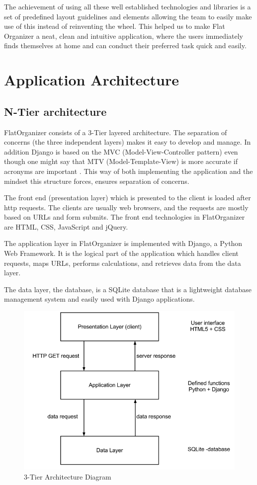 \documentclass{sig-alt-release2}
\begin{document}
The achievement of using all these well established technologies and libraries is a set of predefined layout guidelines and elements allowing the team to easily make use of this instead of reinventing the wheel. This helped us to make Flat Organizer a neat, clean and intuitive application, where the users immediately finds themselves at home and can conduct their preferred task quick and easily.

\section{Application Architecture}

\subsection{N-Tier architecture}
FlatOrganizer consists of a 3-Tier layered architecture. The separation of
concerns (the three independent layers) makes it easy to develop and manage. In
addition Django is based on the MVC (Model-View-Controller pattern) even though
one might say that MTV (Model-Template-View) is more accurate if acronyms are
important \cite{django1}. This way of both implementing the application and the
mindset this structure forces, ensures separation of concerns.

The front end (presentation layer) which is presented to the client is loaded
after http requests. The clients are usually web browsers, and the requests are
mostly based on URLs and form submits. The front end technologies in
FlatOrganizer are HTML, CSS, JavaScript and jQuery.

The application layer in FlatOrganizer is implemented with Django, a Python Web
Framework. It is the logical part of the application which handles client
requests, maps URLs, performs calculations, and retrieves data from the data
layer.

The data layer, the database, is a SQLite database that is a lightweight
database management system and easily used with Django applications.

\begin{figure}[!ht]
\centering
\includegraphics[scale=0.3]{3tier}
\caption{ 3-Tier Architecture Diagram}
\label{fig:3tier}
\end{figure}
\end{document}
